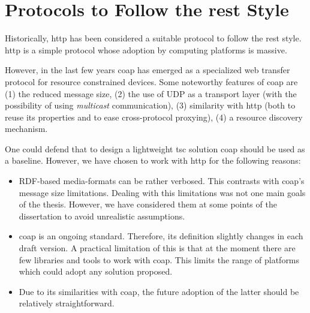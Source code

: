 


\section{Protocols to Follow the \ac{rest} Style}
\label{sec:protocols}


Historically, \acf{http} has been considered a suitable protocol to follow the \ac{rest} style. %
\ac{http} is a simple protocol whose adoption by computing platforms is massive.


However, in the last few years \acf{coap} has emerged as a specialized web transfer protocol for resource constrained devices. %
Some noteworthy features of \ac{coap} are
(1) the reduced message size,
(2) the use of UDP as a transport layer (with the possibility of using \emph{multicast} communication),
(3) similarity with \ac{http} (both to reuse its properties and to ease cross-protocol proxying),
(4) a resource discovery mechanism. %


One could defend that to design a lightweight \ac{tsc} solution \ac{coap} should be used as a baseline.
However, we have chosen to work with \ac{http} for the following reasons:
\begin{itemize}
  \item RDF-based media-formats can be rather verbosed.
	This contrasts with \ac{coap}'s message size limitations.
	Dealing with this limitations was not one main goals of the thesis.
	However, we have considered them at some points of the dissertation to avoid unrealistic assumptions.
  \item \ac{coap} is an ongoing standard.
        Therefore, its definition slightly changes in each draft version.
        A practical limitation of this is that at the moment there are few libraries
        and tools to work with \ac{coap}.
        This limits the range of platforms which could adopt any solution proposed.
  \item Due to its similarities with \ac{coap}, the future adoption of the latter should be relatively straightforward.
\end{itemize}



